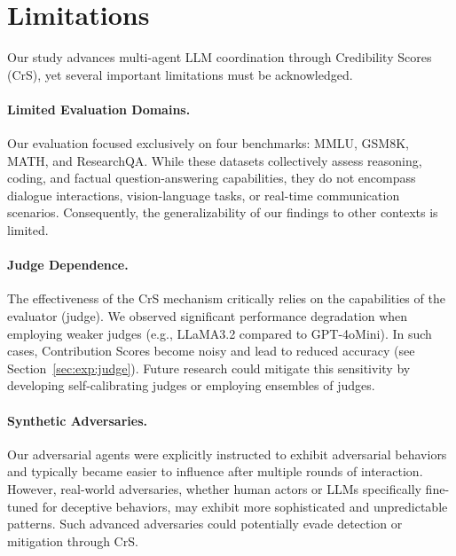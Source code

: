 \section{Limitations}
\label{sec:limitations}

Our study advances multi-agent LLM coordination through Credibility Scores (CrS), yet several important limitations must be acknowledged.

\paragraph{Limited Evaluation Domains.}
Our evaluation focused exclusively on four benchmarks: MMLU, GSM8K, MATH, and ResearchQA. While these datasets collectively assess reasoning, coding, and factual question-answering capabilities, they do not encompass dialogue interactions, vision-language tasks, or real-time communication scenarios. Consequently, the generalizability of our findings to other contexts is limited.

\paragraph{Judge Dependence.}
The effectiveness of the CrS mechanism critically relies on the capabilities of the evaluator (judge). We observed significant performance degradation when employing weaker judges (e.g., LLaMA3.2 compared to GPT-4oMini). In such cases, Contribution Scores become noisy and lead to reduced accuracy (see Section~\ref{sec:exp:judge}). Future research could mitigate this sensitivity by developing self-calibrating judges or employing ensembles of judges.

\paragraph{Synthetic Adversaries.}
Our adversarial agents were explicitly instructed to exhibit adversarial behaviors and typically became easier to influence after multiple rounds of interaction. However, real-world adversaries, whether human actors or LLMs specifically fine-tuned for deceptive behaviors, may exhibit more sophisticated and unpredictable patterns. Such advanced adversaries could potentially evade detection or mitigation through CrS.

